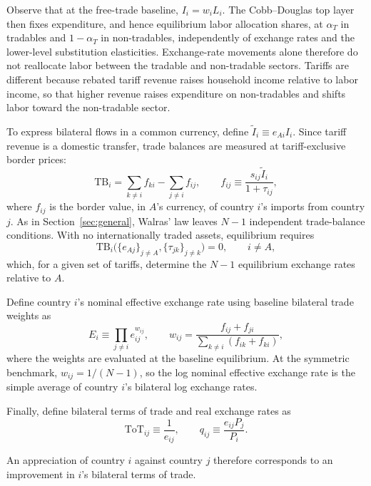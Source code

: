 \documentclass[11pt]{article}
\begin{document}
Observe that at the free-trade baseline, $I_i=w_iL_i$. The Cobb--Douglas top layer then fixes expenditure, and hence equilibrium labor allocation shares, at $\alpha_T$ in tradables and $1-\alpha_T$ in non-tradables, independently of exchange rates and the lower-level substitution elasticities. Exchange-rate movements alone therefore do not reallocate labor between the tradable and non-tradable sectors. Tariffs are different because rebated tariff revenue raises household income relative to labor income, so that higher revenue raises expenditure on non-tradables and shifts labor toward the non-tradable sector. 

To express bilateral flows in a common currency, define $\widetilde I_i\equiv e_{Ai}I_i$. Since tariff revenue is a domestic transfer, trade balances are measured at tariff-exclusive border prices:
\begin{equation}
\mathrm{TB}_i=\sum_{k\neq i}f_{ki}-\sum_{j\neq i}f_{ij}, \qquad
f_{ij}\equiv\frac{s_{ij}\widetilde I_i}{1+\tau_{ij}},
\label{eq:tb}
\end{equation}
where $f_{ij}$ is the border value, in $A$'s currency, of country $i$'s imports from country $j$. As in Section~\ref{sec:general}, Walras' law leaves $N-1$ independent trade-balance conditions. With no internationally traded assets, equilibrium requires
\[
\mathrm{TB}_i\bigl(\{e_{Aj}\}_{j\neq A},\{\tau_{jk}\}_{j\neq k}\bigr)=0, \qquad i\neq A,
\]
which, for a given set of tariffs, determine the $N-1$ equilibrium exchange rates relative to $A$.

Define country $i$'s nominal effective exchange rate using baseline bilateral trade weights as
\begin{equation}
E_i\equiv\prod_{j\neq i}e_{ij}^{w_{ij}}, \qquad
w_{ij}=\frac{f_{ij}+f_{ji}}{\sum_{k\neq i}(f_{ik}+f_{ki})},
\label{eq:neer}
\end{equation}
where the weights are evaluated at the baseline equilibrium. At the symmetric benchmark, $w_{ij}=1/(N-1)$, so the log nominal effective exchange rate is the simple average of country $i$'s bilateral log exchange rates.

Finally, define bilateral terms of trade and real exchange rates as
\begin{equation}
\mathrm{ToT}_{ij}\equiv\frac{1}{e_{ij}}, \qquad
q_{ij}\equiv\frac{e_{ij}P_j}{P_i}.
\label{eq:rer}
\end{equation}

An appreciation of country $i$ against country $j$ therefore corresponds to an improvement in $i$'s bilateral terms of trade.
\end{document}
